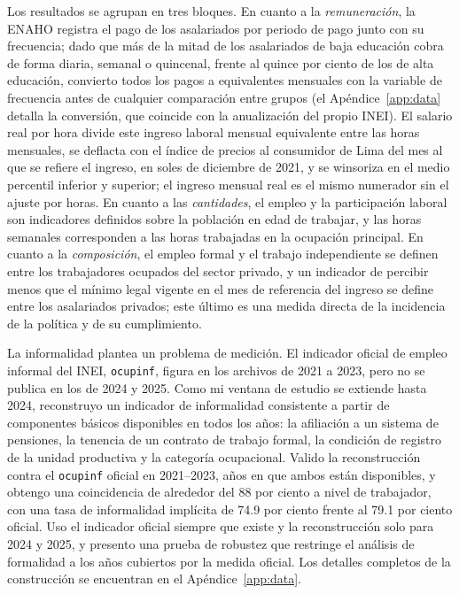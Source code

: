 Los resultados se agrupan en tres bloques. En cuanto a la \emph{remuneración}, la ENAHO registra el pago de los asalariados por periodo de pago junto con su frecuencia; dado que más de la mitad de los asalariados de baja educación cobra de forma diaria, semanal o quincenal, frente al quince por ciento de los de alta educación, convierto todos los pagos a equivalentes mensuales con la variable de frecuencia antes de cualquier comparación entre grupos (el Apéndice~\ref{app:data} detalla la conversión, que coincide con la anualización del propio INEI). El salario real por hora divide este ingreso laboral mensual equivalente entre las horas mensuales, se deflacta con el índice de precios al consumidor de Lima del mes al que se refiere el ingreso, en soles de diciembre de 2021, y se winsoriza en el medio percentil inferior y superior; el ingreso mensual real es el mismo numerador sin el ajuste por horas. En cuanto a las \emph{cantidades}, el empleo y la participación laboral son indicadores definidos sobre la población en edad de trabajar, y las horas semanales corresponden a las horas trabajadas en la ocupación principal. En cuanto a la \emph{composición}, el empleo formal y el trabajo independiente se definen entre los trabajadores ocupados del sector privado, y un indicador de percibir menos que el mínimo legal vigente en el mes de referencia del ingreso se define entre los asalariados privados; este último es una medida directa de la incidencia de la política y de su cumplimiento.

La informalidad plantea un problema de medición. El indicador oficial de empleo informal del INEI, \texttt{ocupinf}, figura en los archivos de 2021 a 2023, pero no se publica en los de 2024 y 2025. Como mi ventana de estudio se extiende hasta 2024, reconstruyo un indicador de informalidad consistente a partir de componentes básicos disponibles en todos los años: la afiliación a un sistema de pensiones, la tenencia de un contrato de trabajo formal, la condición de registro de la unidad productiva y la categoría ocupacional. Valido la reconstrucción contra el \texttt{ocupinf} oficial en 2021--2023, años en que ambos están disponibles, y obtengo una coincidencia de alrededor del 88 por ciento a nivel de trabajador, con una tasa de informalidad implícita de 74.9 por ciento frente al 79.1 por ciento oficial. Uso el indicador oficial siempre que existe y la reconstrucción solo para 2024 y 2025, y presento una prueba de robustez que restringe el análisis de formalidad a los años cubiertos por la medida oficial. Los detalles completos de la construcción se encuentran en el Apéndice~\ref{app:data}.

